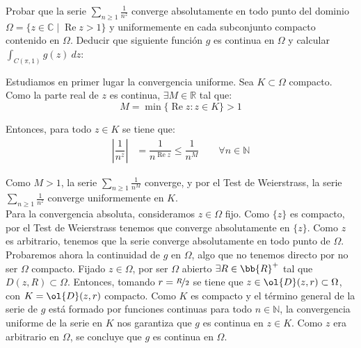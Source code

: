 \documentclass[12pt]{article}
\renewcommand{\Re}{\operatorname{Re}} %
\begin{document}
    \newpage
    \setcounter{ejercicio}{0}

    \begin{ejercicio}[4 puntos]
        Probar que la serie $\displaystyle \sum_{n\geq 1} \frac{1}{n^z}$ converge absolutamente en todo punto del dominio $\Omega = \{ z \in \mathbb{C} \mid \Re z > 1 \}$ y uniformemente en cada subconjunto compacto contenido en $\Omega$. Deducir que siguiente función $g$ es continua en $\Omega$ y calcular $\displaystyle \int_{C(\pi,1)} g(z) \ dz$:

        Estudiamos en primer lugar la convergencia uniforme. Sea $K\subset \Omega$ compacto. Como la parte real de $z$ es continua, $\exists M\in \mathbb{R}$ tal que:
        \begin{equation*}
            M=\min\{\Re z : z\in K\} > 1
        \end{equation*}
        
        Entonces, para todo $z\in K$ se tiene que:
        \begin{align*}
            \left|\dfrac{1}{n^z}\right| &= \dfrac{1}{n^{\Re z}} \leq \dfrac{1}{n^M} \qquad \forall n\in \mathbb{N}
        \end{align*}

        Como $M> 1$, la serie $\displaystyle \sum_{n\geq 1} \frac{1}{n^M}$ converge, y por el Test de Weierstrass, la serie $\displaystyle \sum_{n\geq 1} \frac{1}{n^z}$ converge uniformemente en $K$.\\

        Para la convergencia absoluta, consideramos $z\in \Omega$ fijo. Como $\{z\}$ es compacto, por el Test de Weierstrass tenemos que converge absolutamente en $\{z\}$. Como $z$ es arbitrario, tenemos que la serie converge absolutamente en todo punto de $\Omega$.\\
        
        Probaremos ahora la continuidad de $g$ en $\Omega$, algo que no tenemos directo por no ser $\Omega$ compacto. Fijado $z\in \Omega$, por ser $\Omega$ abierto $\exists R\in \bb{R}^+$ tal que $D(z,R)\subset \Omega$. Entonces, tomando $r=\nicefrac{R}{2}$ se tiene que $z\in \ol{D}(z,r)\subset \Omega$, con $K=\ol{D}(z,r)$ compacto. Como $K$ es compacto y el término general de la serie de $g$ está formado por funciones continuas para todo $n\in \mathbb{N}$, la convergencia uniforme de la serie en $K$ nos garantiza que $g$ es continua en $z\in K$. Como $z$ era arbitrario en $\Omega$, se concluye que $g$ es continua en $\Omega$.\\


\end{ejercicio}
\end{document}
